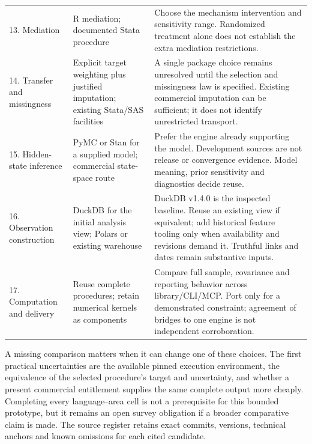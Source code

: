 \begin{longtable}{P{2.2cm}P{4.3cm}P{7.7cm}}
13. Mediation & R mediation; documented Stata procedure & Choose the mechanism intervention and sensitivity range. Randomized treatment alone does not establish the extra mediation restrictions. \citep{exec24_mediation_original,exec24_mediation_sources,exec13_ci_stata_mediate}\\[5pt]
14. Transfer and missingness & Explicit target weighting plus justified imputation; existing Stata/SAS facilities & A single package choice remains unresolved until the selection and missingness law is specified. Existing commercial imputation can be sufficient; it does not identify unrestricted transport. \citep{pearltransport2014,exec21_transport_stata_mi,exec21_transport_sas_mi_intro}\\[5pt]
15. Hidden-state inference & PyMC or Stan for a supplied model; commercial state-space route & Prefer the engine already supporting the model. Development sources are not release or convergence evidence. Model meaning, prior sensitivity and diagnostics decide reuse. \citep{exec23_pymc_sources,exec25_bsw_stan,exec22_state_stata_sspace_post}\\[5pt]
16. Observation construction & DuckDB for the initial analysis view; Polars or existing warehouse & DuckDB v1.4.0 is the inspected baseline. Reuse an existing view if equivalent; add historical feature tooling only when availability and revisions demand it. Truthful links and dates remain substantive inputs. \citep{exec19_duckdb_source,exec23_polars_sources,exec19_feast_source}\\[5pt]
17. Computation and delivery & Reuse complete procedures; retain numerical kernels as components & Compare full sample, covariance and reporting behavior across library/CLI/MCP. Port only for a demonstrated constraint; agreement of bridges to one engine is not independent corroboration. \citep{exec25_paneljava_commons,exec25_panelcxx_fixest,exec25_panelother_julia}\\
\bottomrule
\end{longtable}
\endgroup

A missing comparison matters when it can change one of these choices. The
first practical uncertainties are the available pinned execution environment,
the equivalence of the selected procedure's target and uncertainty, and
whether a present commercial entitlement supplies the same complete output
more cheaply. Completing every language--area cell is not a prerequisite
for this bounded prototype, but it remains an open survey obligation if a
broader comparative claim is made. The source register retains exact commits,
versions, technical anchors and known omissions for each cited candidate.
